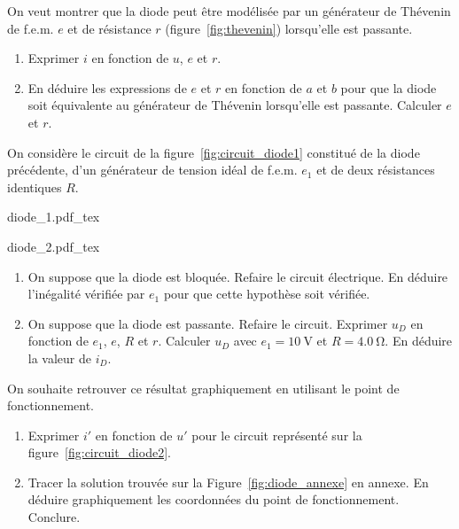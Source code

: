 \documentclass[a4paper, 10pt, garamond, oneside]{book}
\begin{document}
{	On veut montrer que la diode peut être modélisée par un générateur de
	Thévenin de f.e.m. $e$ et de résistance $r$ (figure~\ref{fig:thevenin})
	lorsqu'elle est passante.
	\begin{enumerate}
		\item Exprimer $i$ en fonction de $u$, $e$ et $r$.
		\item En déduire les expressions de $e$ et $r$ en fonction de $a$ et $b$
      pour que la diode soit équivalente au générateur de Thévenin lorsqu'elle
      est passante. Calculer $e$ et $r$.
	\end{enumerate}
	On considère le circuit de la figure~\ref{fig:circuit_diode1} constitué de la
  diode précédente, d'un générateur de tension idéal de f.e.m. $e_1$ et de deux
  résistances identiques $R$.
	\smallbreak
	\noindent
	\begin{minipage}[t]{.5\linewidth}
		\begin{center}
			{diode_1.pdf_tex}
			\label{fig:circuit_diode1}
		\end{center}
	\end{minipage}
	\begin{minipage}[t]{.5\linewidth}
		\begin{center}
			{diode_2.pdf_tex}
			\label{fig:circuit_diode2}
		\end{center}
	\end{minipage}
	\begin{enumerate}
		\item On suppose que la diode est bloquée. Refaire le circuit électrique.
      En déduire l'inégalité vérifiée par $e_1$ pour que cette hypothèse soit
      vérifiée.
		\item On suppose que la diode est passante. Refaire le circuit. Exprimer
      $u_D$ en fonction de $e_1$, $e$, $R$ et $r$. Calculer $u_D$ avec
      $e_1=\SI{10}{\volt}$ et $R=\SI{4.0}{\ohm}$. En déduire la valeur de $i_D$.
	\end{enumerate}

	On souhaite retrouver ce résultat graphiquement en utilisant le point de
  fonctionnement.
	\begin{enumerate}
		\item Exprimer $i'$ en fonction de $u'$ pour le circuit représenté sur la
          figure~\ref{fig:circuit_diode2}.
		\item Tracer la solution trouvée sur la Figure~\ref{fig:diode_annexe} en
          annexe. En déduire graphiquement les coordonnées du point de
          fonctionnement. Conclure.
	\end{enumerate}
}
\end{document}
